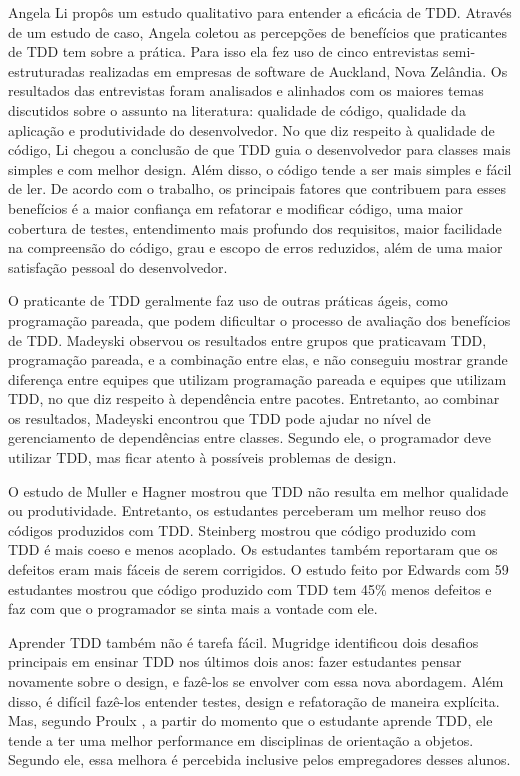 Angela Li \cite{angela-li} propôs um estudo qualitativo para
entender a eficácia de TDD. Através de um estudo de caso, Angela coletou as 
percepções de benefícios que praticantes de TDD tem sobre a prática. Para isso ela
fez uso de cinco entrevistas semi-estruturadas realizadas em empresas de software de 
Auckland, Nova Zelândia. Os resultados das entrevistas foram analisados e alinhados
com os maiores temas discutidos sobre o assunto na literatura: qualidade de código,
qualidade da aplicação e produtividade do desenvolvedor.
No que diz respeito à qualidade de código, Li chegou a conclusão de
que TDD guia o desenvolvedor para classes mais simples e com melhor design. 
Além disso, o código tende a ser mais simples e fácil de ler.
De acordo com o trabalho, os principais fatores que contribuem para esses benefícios
é a maior confiança em refatorar e modificar código, uma maior cobertura de testes,
entendimento mais profundo dos requisitos, maior facilidade na compreensão do código,
grau e escopo de erros reduzidos, além de uma maior satisfação pessoal do desenvolvedor.

O praticante de TDD geralmente faz uso de outras práticas ágeis, como
programação pareada, que podem dificultar o processo de avaliação dos benefícios
de TDD. Madeyski \cite{madeyski-package-dependencies} observou os resultados
entre grupos que praticavam TDD, programação pareada, e a combinação entre elas,
e não conseguiu mostrar grande diferença entre equipes que utilizam programação 
pareada e equipes que utilizam TDD, no que diz respeito à dependência entre 
pacotes. Entretanto, ao combinar os resultados, Madeyski encontrou que TDD pode 
ajudar no nível de gerenciamento de dependências entre classes. Segundo ele, o 
programador deve utilizar TDD, mas ficar atento à possíveis problemas de design.

O estudo de Muller e Hagner \cite{muller-e-hagner} mostrou que TDD não resulta
em melhor qualidade ou produtividade. Entretanto, os estudantes perceberam um 
melhor reuso dos códigos produzidos com TDD. Steinberg \cite{steinberg} mostrou
que código produzido com TDD é mais coeso e menos acoplado. Os estudantes também
reportaram que os defeitos eram mais fáceis de serem corrigidos. O estudo feito
por Edwards \cite{edwards} com 59 estudantes mostrou que código produzido com
TDD tem 45\% menos defeitos e faz com que o programador se sinta mais a vontade
com ele.

Aprender TDD também não é tarefa fácil. Mugridge \cite{mugridge} identificou
dois desafios principais em ensinar TDD nos últimos dois anos: fazer estudantes
pensar novamente sobre o design, e fazê-los se envolver com essa nova
abordagem. Além disso, é difícil fazê-los entender testes, design e refatoração
de maneira explícita. Mas, segundo Proulx \cite{proulx}, a partir do momento que
o estudante aprende TDD, ele tende a ter uma melhor performance em disciplinas
de orientação a objetos. Segundo ele, essa melhora é percebida inclusive pelos
empregadores desses alunos. 

